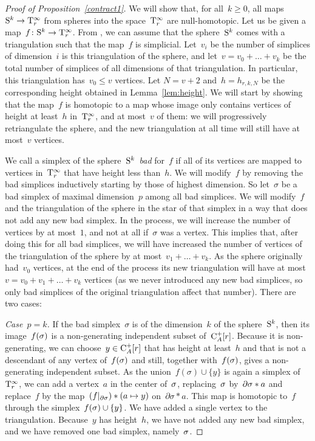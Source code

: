 \begin{proof}[Proof of Proposition~\ref{contract1}]
We will show that, for all~$k\ge 0$, all maps~$\mathrm{S}^k\to\mathrm{T}_r^\infty$ from spheres into the space~$\mathrm{T}_r^\infty$ are null-homotopic. 
Let us be given a map~$f\colon \mathrm{S}^k\to\mathrm{T}_r^\infty$. From \cite{Zeeman}, we can assume that the sphere~$\mathrm{S}^k$ comes with a triangulation such that the map~$f$ is simplicial. 
Let~$v_i$ be the number of simplices of dimension~$i$ is this triangulation of the sphere, and 
let~$v=v_0+\dots+v_k$ be the total number of simplices of all dimensions of that triangulation. In particular, this triangulation has~$v_0\le v$ vertices. Let \hbox{$N=v+2$} and~$h=h_{r,k,N}$ be the corresponding height obtained in Lemma~\ref{lem:height}. We will start by showing that the map~$f$ is homotopic to a map whose image only contains vertices of height at least~$h$ in~$\mathrm{T}_r^\infty$, and at most~$v$ of them: we will progressively retriangulate the sphere, and the new triangulation at all time will still have at most~$v$ vertices. 

We call a simplex of the sphere~$\mathrm{S}^k$~{\it bad} for~$f$ if all of its vertices are mapped to vertices in~$\mathrm{T}_r^\infty$ that have height less than~$h$.
We will modify~$f$ by removing the bad simplices inductively starting by those of highest dimension. 
So let~$\sigma$ be a bad simplex of maximal dimension~$p$ among all bad simplices. We will modify~$f$ and the triangulation of the sphere in the star of that simplex in a way that does not add any new bad simplex. In the process, we will increase the number of vertices by at most~$1$, and not at all if~$\sigma$ was a vertex. 
This implies that, after doing this for all bad simplices, we will have increased the number of vertices of the triangulation of the sphere by at most~$v_1+\dots+v_k$. As the sphere originally had~$v_0$ vertices, at the end of the process its new triangulation will  have at most~$v=v_0+v_1+\dots+v_k$ vertices (as we never introduced any new bad simplices, so only bad simplices of the original triangulation affect that number). There are two cases:

{\em Case~$p=k$.} If the bad simplex~$\sigma$ is of the dimension~$k$ of the sphere~$\mathrm{S}^k$, then its image~$f(\sigma)$ is a non-generating independent subset of~$\mathrm{C}_{A}^+[r]$. Because it is non-generating, we can choose~$y\in \mathrm{C}_A^+[r]$ that has height at least~$h$ and that is not a descendant of any vertex of~$f(\sigma)$ and still, together with~$f(\sigma)$, gives a non-generating independent subset. As the union~$f(\sigma)\cup\{y\}$ is again a simplex of~$\mathrm{T}_r^\infty$, we can add a vertex~$a$ in the center of~$\sigma$, replacing~$\sigma$ by~$\partial \sigma*a$ and replace~$f$ by the map~$(f|_{\partial\sigma})*(a\mapsto y)$ on~$\partial\sigma*a$. This map is homotopic to~$f$ through the simplex~$f(\sigma)\cup \{y\}$. We have added a single vertex to the triangulation. Because~$y$ has height~$h$, we have not added any new bad simplex, and we have removed one bad simplex, namely~$\sigma$. 


\end{proof}
